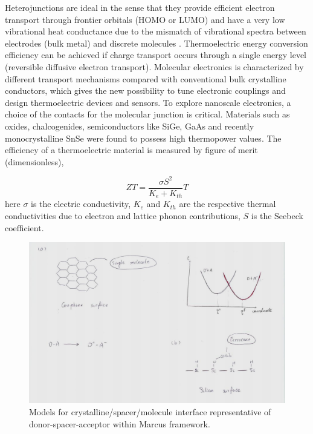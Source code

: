 \documentclass[prb,showpacs,10pt,superscriptaddress]{revtex4-1}
\begin{document}
Heterojunctions \cite{thermoelectric in Molecular junction} are ideal in the sense that they provide efficient electron transport through frontier orbitals (HOMO or LUMO) and have a very low vibrational heat conductance due to the mismatch of vibrational spectra between electrodes (bulk metal) and discrete molecules \cite{Room temperature thermal conductance of alkanedithiol self-assembled monolayers}. Thermoelectric energy conversion efficiency can be achieved if charge transport occurs through a single energy level (reversible diffusive electron transport)\cite{Reversible Thermoelectric Nanomaterials}.
Molecular electronics is characterized by different transport mechanisms compared with conventional bulk crystalline conductors, which gives the new possibility to tune electronic couplings and design thermoelectric devices and sensors\cite{thermoelectric in Molecular junction,thermopower measurements in molecular junctions,Transition from strong to weak electronic coupling in a single-molecular junction}. To explore nanoscale electronics, a choice of the contacts for the molecular junction is critical.
Materials such as oxides, chalcogenides, semiconductors like SiGe, GaAs and recently monocrystalline SnSe \cite{two-step phase transition in SnSe} were found to possess high thermopower values. The efficiency of a thermoelectric material is measured by figure of merit (dimensionless),

\begin{equation}
 ZT = \dfrac{\sigma S^2}{K_{e} + K_{th}} T
\end{equation}
here $\sigma$ is the electric conductivity, $K_{e}$ and $K_{th}$ are the respective thermal conductivities due to electron and lattice phonon contributions, $S$ is the Seebeck coefficient.

\begin{figure}
\includegraphics[width=1.\linewidth,angle=0]{interface_scheme.png}
\caption{\small Models for crystalline/spacer/molecule interface representative of donor-spacer-acceptor within Marcus framework.}
\end{figure}
\end{document}
